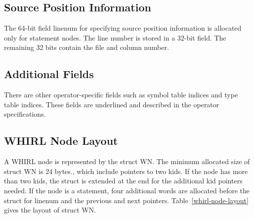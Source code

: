 \documentclass{article}
\begin{document}
\subsection{Source Position Information}

The 64-bit field linenum for specifying source position information
is allocated only for statement nodes. The line number is stored
in a 32-bit
field. The remaining 32 bits contain the file and column number.

\subsection{Additional Fields}

There are other operator-specific fields such as symbol table
indices and type table indices. These fields are underlined and
described in the operator specifications.


\subsection{WHIRL Node Layout}

A WHIRL node is represented by the struct WN. The minimum allocated size
of struct WN is 24 bytes., which include pointers to two kids. If the node
has more than two kids, the struct is extended at the end for the
additional kid pointers needed. If the node is a statement, four
additional words are allocated before the struct for linenum and
the previous and next pointers. 
Table~\ref{whirl-node-layout} gives the layout of struct WN.
\end{document}
